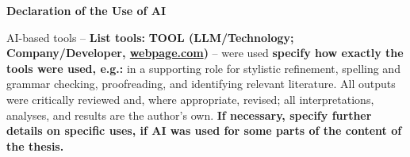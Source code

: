\newcommand{\textfield}[2]{
  \vbox{
    \hsize=#1\kern3cm\hrule\kern1ex
    \hbox to \hsize{\strut\hfil\footnotesize#2\hfil}%
  }
}

\cleardoublepage
\vspace*{1.5 cm}
{\Large
    \noindent
    {\bf Declaration of the Use of AI}} \\
    \vspace*{0.3 cm}

\noindent
AI-based tools -- \textbf{List tools:} \textbf{TOOL (LLM/Technology; Company/Developer, \href{webpage.com}{webpage.com})} -- were used \textbf{specify how exactly the tools were used, e.g.: } in a supporting role for stylistic refinement, spelling and grammar checking, proofreading, and identifying relevant literature. 
All outputs were critically reviewed and, where appropriate, revised; all interpretations, analyses, and results are the author's own.
\textbf{If necessary, specify further details on specific uses, if AI was used for some parts of the content of the thesis.}

\cleardoublepage


